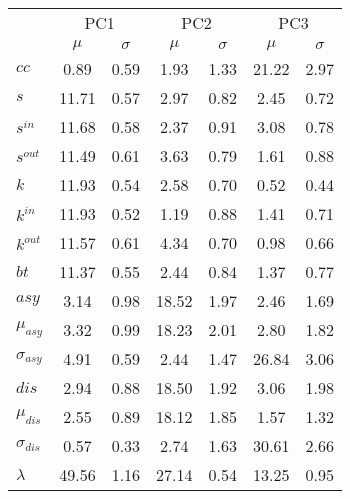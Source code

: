 \documentclass[10pt]{beamer}
\begin{document}
\begin{frame}
\begin{minipage}[t]{0.48\linewidth}
\end{minipage}
\hfill%
	\begin{minipage}[t]{0.48\linewidth}
\begin{table}[!h]
		\tiny
\begin{center}
\begin{tabular}{| l | c | c | c | c | c | c |}\cline{2-7}
\multicolumn{1}{c|}{} & \multicolumn{2}{c|}{PC1}          & \multicolumn{2}{c|}{PC2} & \multicolumn{2}{c|}{PC3}  \\\cline{2-7}\multicolumn{1}{c|}{} & $\mu$            & $\sigma$ & $\mu$         & $\sigma$ & $\mu$ & $\sigma$  \\\hline
$cc$ & 0.89  & 0.59  & 1.93  & 1.33  & 21.22  & 2.97 \\\hline
$s$ & 11.71  & 0.57  & 2.97  & 0.82  & 2.45  & 0.72 \\
$s^{in}$ & 11.68  & 0.58  & 2.37  & 0.91  & 3.08  & 0.78 \\
$s^{out}$ & 11.49  & 0.61  & 3.63  & 0.79  & 1.61  & 0.88 \\
$k$ & 11.93  & 0.54  & 2.58  & 0.70  & 0.52  & 0.44 \\
$k^{in}$ & 11.93  & 0.52  & 1.19  & 0.88  & 1.41  & 0.71 \\
$k^{out}$ & 11.57  & 0.61  & 4.34  & 0.70  & 0.98  & 0.66 \\
$bt$ & 11.37  & 0.55  & 2.44  & 0.84  & 1.37  & 0.77 \\\hline
$asy$ & 3.14  & 0.98  & 18.52  & 1.97  & 2.46  & 1.69 \\
$\mu_{asy}$ & 3.32  & 0.99  & 18.23  & 2.01  & 2.80  & 1.82 \\
$\sigma_{asy}$ & 4.91  & 0.59  & 2.44  & 1.47  & 26.84  & 3.06 \\
$dis$ & 2.94  & 0.88  & 18.50  & 1.92  & 3.06  & 1.98 \\
$\mu_{dis}$ & 2.55  & 0.89  & 18.12  & 1.85  & 1.57  & 1.32 \\
$\sigma_{dis}$ & 0.57  & 0.33  & 2.74  & 1.63  & 30.61  & 2.66 \\\hline\hline
$\lambda$ & 49.56  & 1.16  & 27.14  & 0.54  & 13.25  & 0.95 \\
\hline\end{tabular}
\end{center}
	\end{table}


	\end{minipage}





\end{frame}
\end{document}
